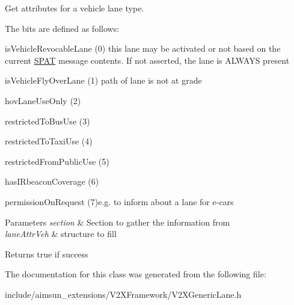 Get attributes for a vehicle lane type. 

The bits are defined as follows\+:


\begin{DoxyItemize}
\item is\+Vehicle\+Revocable\+Lane (0) this lane may be activated or not based on the current \hyperlink{structSPAT}{S\+P\+AT} message contents. If not asserted, the lane is A\+L\+W\+A\+YS present
\item is\+Vehicle\+Fly\+Over\+Lane (1) path of lane is not at grade
\item hov\+Lane\+Use\+Only (2)
\item restricted\+To\+Bus\+Use (3)
\item restricted\+To\+Taxi\+Use (4)
\item restricted\+From\+Public\+Use (5)
\item has\+I\+Rbeacon\+Coverage (6)
\item permission\+On\+Request (7)e.\+g. to inform about a lane for e-\/cars
\end{DoxyItemize}


\begin{DoxyParams}{Parameters}
{\em section} & Section to gather the information from \\
\hline
{\em lane\+Attr\+Veh} & structure to fill \\
\hline
\end{DoxyParams}
\begin{DoxyReturn}{Returns}
true if success 
\end{DoxyReturn}


The documentation for this class was generated from the following file\+:\begin{DoxyCompactItemize}
\item 
include/aimsun\+\_\+extensions/\+V2\+X\+Framework/V2\+X\+Generic\+Lane.\+h\end{DoxyCompactItemize}
